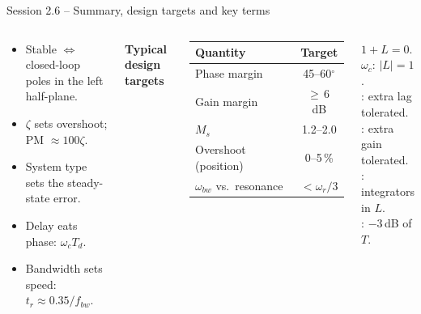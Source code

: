 \documentclass[aspectratio=169,10pt]{beamer}
\begin{document}
\begin{frame}{Session 2.6 -- Summary, design targets and key terms}
\begin{columns}[T]
\begin{keybox}
\footnotesize
\begin{itemize}
  \item Stable $\iff$ closed-loop poles in the left half-plane.
  \item $\zeta$ sets overshoot; PM $\approx100\zeta$.
  \item System type sets the steady-state error.
  \item Delay eats phase: $\omega_cT_d$.
  \item Bandwidth sets speed: $t_r\approx0.35/f_{bw}$.
\end{itemize}
\end{keybox}
\footnotesize
\textbf{Typical design targets}\\[2pt]
\begin{tabular}{@{}lc@{}}
\toprule
Quantity & Target\\
\midrule
Phase margin & 45--60$^\circ$\\
Gain margin & $\ge$\,6\,dB\\
$M_s$ & 1.2--2.0\\
Overshoot (position) & 0--5\,\%\\
$\omega_{bw}$ vs.\ resonance & $<\omega_r/3$\\
\bottomrule
\end{tabular}
\begin{defbox}
\footnotesize
{} $1+L=0$.\\
 $\omega_c$: $|L|=1$.\\
: extra lag tolerated.\\
: extra gain tolerated.\\
: integrators in $L$.\\
: $-3$\,dB of $T$.
\end{defbox}
\end{columns}
\end{frame}

\end{document}
